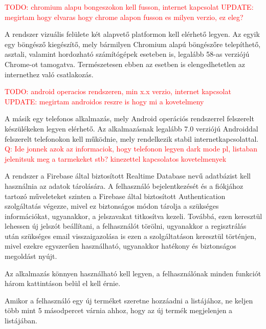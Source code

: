 \textcolor{red}{TODO: chromium alapu bongeszokon kell fusson, internet kapcsolat} \newline
\textcolor{red}{UPDATE: megirtam hogy elvaras hogy chrome alapon fusson es milyen verzio, ez eleg?}

A rendszer vizuális felülete két alapvető platformon kell elérhető legyen. Az egyik egy böngésző kiegészítő, mely bármilyen Chromium alapú böngészőre telepíthető, asztali, valamint hordozható számítógépek eseteben is, legalább 58-as verziójú Chrome-ot tamogatva. Természetesen ebben az esetben is elengedhetetlen az internethez való csatlakozás.

\textcolor{red}{TODO: android operacios rendszeren, min x.x verzio, internet kapcsolat} \newline
\textcolor{red}{UPDATE: megirtam androidos reszre is hogy mi a kovetelmeny}

A másik egy telefonos alkalmazás, mely Android operációs rendszerrel felszerelt készülékeken legyen elérhető. Az alkalmazásnak legalább 7.0 verziójú Androiddal felszerelt telefonokon kell működnie, mely rendelkezik stabil internetkapcsolattal.
\textcolor{red}{Q: Ide jonnek azok az informaciok, hogy telefonon legyen dark mode pl, listaban jelenitsuk meg a tarmekeket stb? kinezettel kapcsolatos kovetelmenyek}


A rendszer a Firebase által biztosított Realtime Database nevű adatbázist kell használnia az adatok tárolására. A felhasználó bejelentkezését és a fiókjához tartozó műveleteket szinten a Firebase által biztosított Authentication szolgáltatás végezze, mivel ez biztonságos módon tárolja a szükséges információkat, ugyanakkor, a jelszavakat titkosítva kezeli. Továbbá, ezen keresztül lehessen új jelszót beállítani, a felhasználót törölni, ugyanakkor a regisztrálás után szükséges email visszaigazolása is ezen a szolgáltatáson keresztül történjen, mivel ezekre egyszerűen használható, ugyanakkor hatékony és biztonságos megoldást nyújt.

Az alkalmazás könnyen használható kell legyen, a felhasználónak minden funkciót három kattintáson belül el kell érnie. 

Amikor a felhasználó egy új terméket szeretne hozzáadni a listájához, ne keljen több mint 5 másodpercet várnia ahhoz, hogy az új termék megjelenjen a listájában. 
